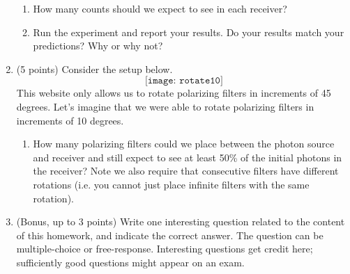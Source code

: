 \documentclass[12pt]{article}
\begin{document}
\begin{enumerate}[font=\bfseries]
    \begin{enumerate}
        \item How many counts should we expect to see in each receiver? 
        \item Run the experiment and report your results. Do your results match your predictions? Why or why not?
    \end{enumerate}
    \item (5 points) Consider the setup below.
    \[\texttt{[image: rotate10]}\]
    This website only allows us to rotate polarizing filters in increments of 45 degrees. Let's imagine that we were able to rotate polarizing filters in increments of 10 degrees.
    \begin{enumerate}
        \item How many polarizing filters could we place between the photon source and receiver and still expect to see at least 50\% of the initial photons in the receiver? Note we also require that consecutive filters have different rotations (i.e. you cannot just place infinite filters with the same rotation).
    \end{enumerate}
    \item (Bonus, up to 3 points) Write one interesting question related to the content of this homework, and indicate the correct answer. The question can be multiple-choice or free-response.  Interesting questions get credit here;  sufficiently good questions might appear on an exam.
\end{enumerate}
\end{document}
